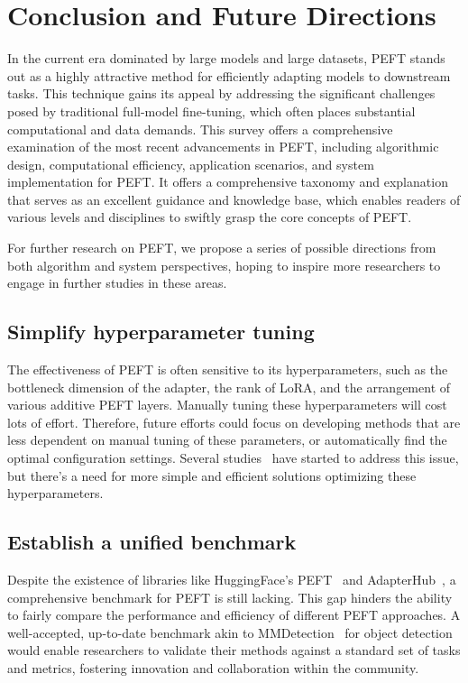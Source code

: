 \section{Conclusion and Future Directions}
\label{sec:conslusion}

In the current era dominated by large models and large datasets, PEFT stands out as a highly attractive method for efficiently adapting models to downstream tasks. This technique gains its appeal by addressing the significant challenges posed by traditional full-model fine-tuning, which often places substantial computational and data demands. This survey offers a comprehensive examination of the most recent advancements in PEFT, including algorithmic design, computational efficiency, application scenarios, and system implementation for PEFT. It offers a comprehensive taxonomy and explanation that serves as an excellent guidance and knowledge base, which enables readers of various levels and disciplines to swiftly grasp the core concepts of PEFT.

For further research on PEFT, we propose a series of possible directions from both algorithm and system perspectives, hoping to inspire more researchers to engage in further studies in these areas.


\subsection{Simplify hyperparameter tuning} 
The effectiveness of PEFT is often sensitive to its hyperparameters, such as the bottleneck dimension of the adapter, the rank of LoRA, and the arrangement of various additive PEFT layers. Manually tuning these hyperparameters will cost lots of effort. Therefore, future efforts could focus on developing methods that are less dependent on manual tuning of these parameters, or automatically find the optimal configuration settings. Several studies~\cite{valipour2022dylora,adalora,SORA,chen2023parameter,noah,autopeft} have started to address this issue, but there's a need for more simple and efficient solutions optimizing these hyperparameters.

\subsection{Establish a unified benchmark}
Despite the existence of libraries like HuggingFace's PEFT~\cite{huggingfacepeft} and AdapterHub~\cite{poth2023adapters}, a comprehensive benchmark for PEFT is still lacking. This gap hinders the ability to fairly compare the performance and efficiency of different PEFT approaches. A well-accepted, up-to-date benchmark akin to MMDetection~\cite{mmdetection} for object detection would enable researchers to validate their methods against a standard set of tasks and metrics, fostering innovation and collaboration within the community.

